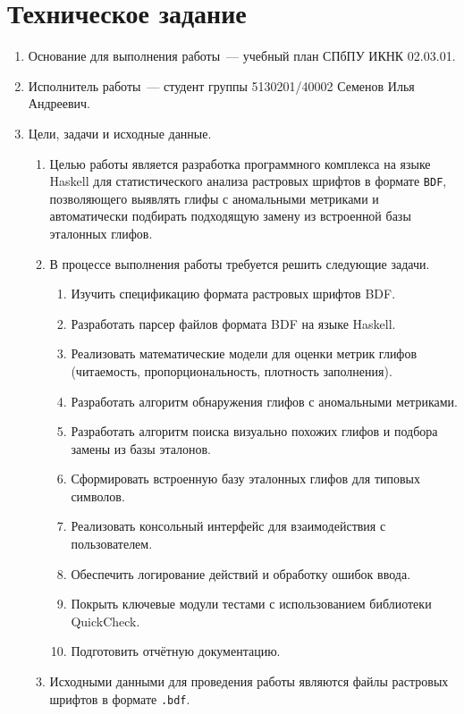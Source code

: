 \section{Техническое задание}

\begin{enumerate}
    \item Основание для выполнения работы~--- учебный план СПбПУ ИКНК 02.03.01.
    \item Исполнитель работы~--- студент группы 5130201/40002 Семенов Илья Андреевич.
    \item Цели, задачи и исходные данные.
        \begin{enumerate}[label=\alph*.]
            \item Целью работы является разработка программного комплекса на языке Haskell для статистического анализа растровых шрифтов в формате \verb|BDF|, позволяющего выявлять глифы с аномальными метриками и автоматически подбирать подходящую замену из встроенной базы эталонных глифов.
            \item В процессе выполнения работы требуется решить следующие задачи.
            \begin{enumerate}
                \item Изучить спецификацию формата растровых шрифтов BDF.
                \item Разработать парсер файлов формата BDF на языке Haskell.
                \item Реализовать математические модели для оценки метрик глифов (читаемость, пропорциональность, плотность заполнения).
                \item Разработать алгоритм обнаружения глифов с аномальными метриками.
                \item Разработать алгоритм поиска визуально похожих глифов и подбора замены из базы эталонов.
                \item Сформировать встроенную базу эталонных глифов для типовых символов.
                \item Реализовать консольный интерфейс для взаимодействия с пользователем.
                \item Обеспечить логирование действий и обработку ошибок ввода.
                \item Покрыть ключевые модули тестами с использованием библиотеки QuickCheck.
                \item Подготовить отчётную документацию.
            \end{enumerate}
            \item Исходными данными для проведения работы являются файлы растровых шрифтов в формате \verb|.bdf|.

\end{enumerate}
\end{enumerate}
